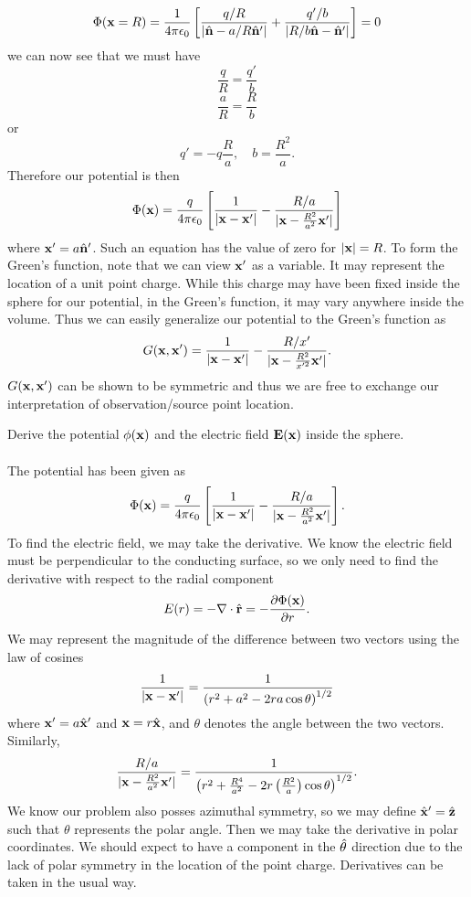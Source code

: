 \documentclass[11pt,letterpaper]{article}
\begin{document}
			\[
				\Phi(\vect x = R) = \frac{1}{4\pi\epo}\blr{\frac{q/R}{|\vecth n-a/R\vecth n'|}+\frac{q'/b}{|R/b\vecth n - \vecth n'|}} = 0
			\]
			we can now see that we must have
			\[
				\frac{q}{R} = \frac{q'}{b}
			\]
			\[
				\frac{a}{R} = \frac{R}{b}
			\]
			or
			\[
				q' = -q\frac{R}{a},\quad b = \frac{R^2}{a}.
			\]
			Therefore our potential is then
			\[
				\Phi(\vect x) = \frac{q}{4\pi\epo}	\blr{\frac{1}{|\vect x-\vect x'|}-\frac{R/a}{|\vect x-\frac{R^2}{a^2}\vect x'|}}
			\]
			where $\vect x' = a\vecth n'$. Such an equation has the value of zero for $|\vect x| = R$. To form the Green's function,
			note that we can view $\vect x'$ as a variable. It may represent the location of a unit point charge. While this charge may
			have been fixed inside the sphere for our potential, in the Green's function, it may vary anywhere inside the volume. Thus 
			we can easily generalize our potential to the Green's function as
			\[
					G(\vect x,\vect x') = \frac{1}{|\vect x-\vect x'|}-\frac{R/x'}{|\vect x-\frac{R^2}{x'^2}\vect x'|}.
			\]
			$G(\vect x,\vect x')$ can be shown to be symmetric and thus we are free to exchange our interpretation of observation/source
			point location. 
			\\
			\item
			Derive the potential $\phi(\vect x)$ and the electric field $\vect E(\vect x)$ inside the sphere.
			\\
			\\
			The potential has been given as
			\[
				\Phi(\vect x) = \frac{q}{4\pi\epo}	\blr{\frac{1}{|\vect x-\vect x'|}-\frac{R/a}{|\vect x-\frac{R^2}{a^2}\vect x'|}}.
			\]
			To find the electric field, we may take the derivative. We know the electric field must be perpendicular to the conducting
			surface, so we only need to find the derivative with respect to the radial component
			\[
				 E(r) = -\del\cdot\vecth r = -\pdiff[\Phi(\vect x)]{r}.
			\]
			We may represent the magnitude of the difference between two vectors using the law of cosines
			\[
				\frac{1}{|\vect x-\vect x'|} = \frac{1}{\plr{r^2+a^2-2ra\cos\theta}^{1/2}}
			\]
			where $\vect x' = a\vecth x'$ and $\vect x = r\vecth x$, and $\theta$ denotes the angle between the two vectors.  Similarly,
			\[
				\frac{R/a}{|\vect x-\frac{R^2}{a^2}\vect x'|} = \frac{1}{\plr{r^2+\frac{R^4}{a^2}-2r\pfrac{R^2}{a}\cos\theta}^{1/2}}.
			\]
			We know our problem also posses azimuthal symmetry, so we may define $\vecth x' = \vecth z$ such that $\theta$
			represents the polar angle. Then we may take the derivative in polar coordinates. We should expect to have a component
			in the $\vecth \theta$ direction due to the lack of polar symmetry in the location of the point charge. Derivatives 
			can be taken in the usual way. 
			
\end{document}
